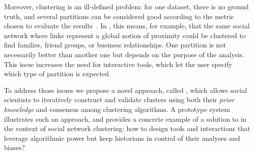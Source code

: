 Moreover, clustering is an ill-defined problem: for one dataset, there is no ground truth, and several partitions can be considered good according to the metric chosen to evaluate the results~\cite{kleinbergImpossibilityTheoremClustering2002}.
In \sna, this means, for example, that the same social network where links represent a global notion of proximity could be clustered to find families, friend groups, or business relationships.
One partition is not necessarily better than another one but depends on the purpose of the analysis.
This issue increases the need for interactive tools, which let the user specify which type of partition is expected.

To address those issues we propose a novel approach, called \pkclustering, which allows social scientists to iteratively construct and validate clusters using both their \emph{prior knowledge} and consensus among clustering algorithms.
A prototype system illustrates such an approach, and provides a concrete example of a solution to \qthree in the context of social network clustering: how to design \va tools and interactions that leverage algorithmic power but keep historians in control of their analyses and biases?



